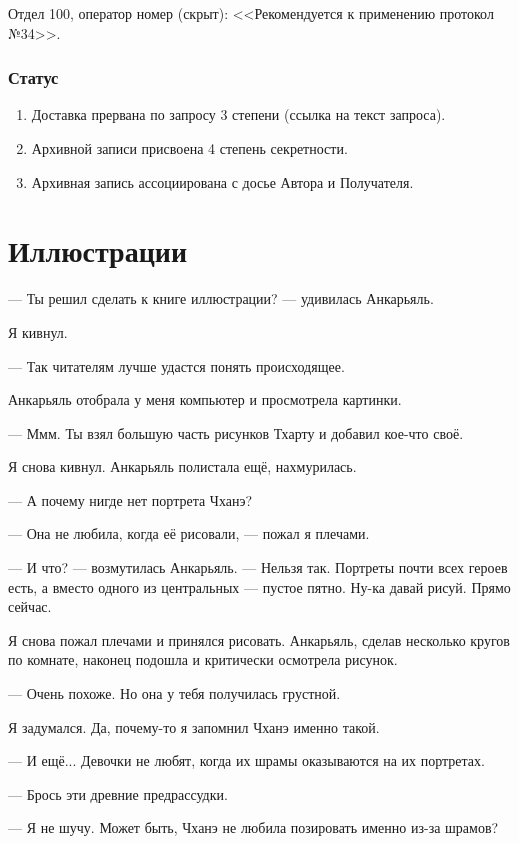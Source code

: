 \documentclass[a4paper,12pt,fleqn]{book}\usepackage{cooltooltips}\usepackage{polyglossia}\setdefaultlanguage[babelshorthands=true]{russian}\setotherlanguage{english}\defaultfontfeatures{Ligatures=TeX,Mapping=tex-text} \usepackage{xcolor}\definecolor{lightgray}{HTML}{bbbbbb}\color{lightgray}\newcommand{\ml}[3]{\textenglish{\textcolor{black}{#3}}}
\begin{document}
{Отдел 100, оператор номер (скрыт): <<Рекомендуется к применению протокол №34>>.

\subsubsection{Статус}

\begin{enumerate}
\item Доставка прервана по запросу 3 степени (ссылка на текст запроса).
\item Архивной записи присвоена 4 степень секретности.
\item Архивная запись ассоциирована с досье Автора и Получателя.
\end{enumerate}

\section{Иллюстрации}

--- Ты решил сделать к книге иллюстрации? --- удивилась Анкарьяль.

Я кивнул.

--- Так читателям лучше удастся понять происходящее.

Анкарьяль отобрала у меня компьютер и просмотрела картинки.

--- Ммм.
Ты взял большую часть рисунков Тхарту и добавил кое-что своё.

Я снова кивнул.
Анкарьяль полистала ещё, нахмурилась.

--- А почему нигде нет портрета Чханэ?

--- Она не любила, когда её рисовали, --- пожал я плечами.

--- И что? --- возмутилась Анкарьяль.
--- Нельзя так.
Портреты почти всех героев есть, а вместо одного из центральных --- пустое пятно.
Ну-ка давай рисуй.
Прямо сейчас.

Я снова пожал плечами и принялся рисовать.
Анкарьяль, сделав несколько кругов по комнате, наконец подошла и критически осмотрела рисунок.

--- Очень похоже.
Но она у тебя получилась грустной.

Я задумался.
Да, почему-то я запомнил Чханэ именно такой.

--- И ещё... Девочки не любят, когда их шрамы оказываются на их портретах.

--- Брось эти древние предрассудки.

--- Я не шучу.
Может быть, Чханэ не любила позировать именно из-за шрамов?

}
\end{document}

